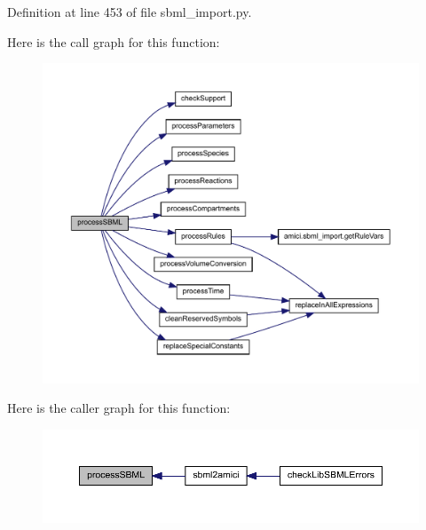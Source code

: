 Definition at line 453 of file sbml\+\_\+import.\+py.

Here is the call graph for this function\+:
\nopagebreak
\begin{figure}[H]
\begin{center}
\leavevmode
\includegraphics[width=350pt]{classamici_1_1sbml__import_1_1_sbml_importer_ac188693ab1d9fc500d55748dbde9bf89_cgraph}
\end{center}
\end{figure}
Here is the caller graph for this function\+:
\nopagebreak
\begin{figure}[H]
\begin{center}
\leavevmode
\includegraphics[width=350pt]{classamici_1_1sbml__import_1_1_sbml_importer_ac188693ab1d9fc500d55748dbde9bf89_icgraph}
\end{center}
\end{figure}
\mbox{\label{classamici_1_1sbml__import_1_1_sbml_importer_ae9585f937c02f0618abeb06dd48bcd54}} 
